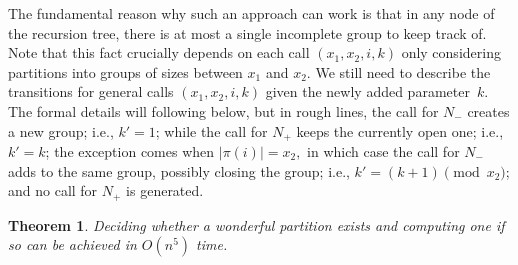 \documentclass[a4paper]{article}
\newcommand{\modulus}[1]{\vert #1 \vert}
\newtheorem{theorem}{Theorem}\newtheorem{lemma}[theorem]{Lemma}\newtheorem{proposition}[theorem]{Proposition}\newtheorem{corollary}[theorem]{Corollary}\newtheorem{definition}[theorem]{Definition}
\begin{document}
The fundamental reason why such an approach can work is that in any node of the recursion tree, there is at most a single incomplete group to keep track of. Note that this fact crucially depends on each call $(x_1, x_2, i, k)$ only considering partitions into groups of sizes between $x_1$ and $x_2.$ We still need to describe the transitions for general calls $(x_1, x_2, i, k)$ given the newly added parameter~$k$. The formal details will following below, but in rough lines, the call for $N_{-}$ creates a new group; i.e., $k' = 1$; while the call for $N_{+}$ keeps the currently open one; i.e., $k' = k$; the exception comes when $\modulus{\pi(i)} = x_2,$ in which case the call for $N_{-}$ adds to the same group, possibly closing the group; i.e., $k' = (k + 1) \pmod{x_2}$; and no call for $N_{+}$ is generated.


\begin{theorem}  \label{thm:hiking-is-poly-time} Deciding whether a wonderful partition exists and computing one if so can be achieved in $O(n^5)$ time.
\end{theorem}
\end{document}
